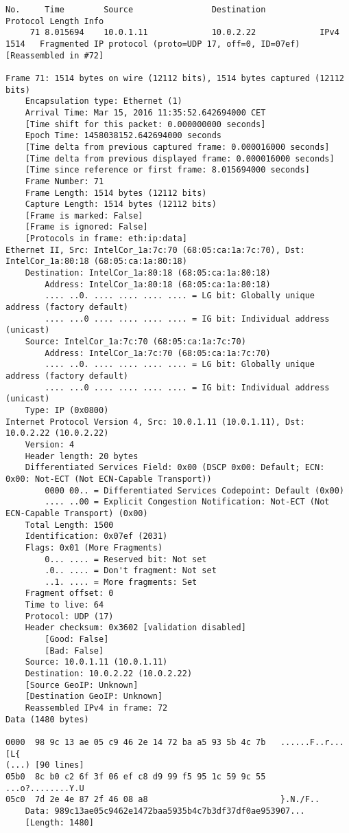 \begin{lstlisting}
No.     Time        Source                Destination           Protocol Length Info
     71 8.015694    10.0.1.11             10.0.2.22             IPv4     1514   Fragmented IP protocol (proto=UDP 17, off=0, ID=07ef) [Reassembled in #72]

Frame 71: 1514 bytes on wire (12112 bits), 1514 bytes captured (12112 bits)
    Encapsulation type: Ethernet (1)
    Arrival Time: Mar 15, 2016 11:35:52.642694000 CET
    [Time shift for this packet: 0.000000000 seconds]
    Epoch Time: 1458038152.642694000 seconds
    [Time delta from previous captured frame: 0.000016000 seconds]
    [Time delta from previous displayed frame: 0.000016000 seconds]
    [Time since reference or first frame: 8.015694000 seconds]
    Frame Number: 71
    Frame Length: 1514 bytes (12112 bits)
    Capture Length: 1514 bytes (12112 bits)
    [Frame is marked: False]
    [Frame is ignored: False]
    [Protocols in frame: eth:ip:data]
Ethernet II, Src: IntelCor_1a:7c:70 (68:05:ca:1a:7c:70), Dst: IntelCor_1a:80:18 (68:05:ca:1a:80:18)
    Destination: IntelCor_1a:80:18 (68:05:ca:1a:80:18)
        Address: IntelCor_1a:80:18 (68:05:ca:1a:80:18)
        .... ..0. .... .... .... .... = LG bit: Globally unique address (factory default)
        .... ...0 .... .... .... .... = IG bit: Individual address (unicast)
    Source: IntelCor_1a:7c:70 (68:05:ca:1a:7c:70)
        Address: IntelCor_1a:7c:70 (68:05:ca:1a:7c:70)
        .... ..0. .... .... .... .... = LG bit: Globally unique address (factory default)
        .... ...0 .... .... .... .... = IG bit: Individual address (unicast)
    Type: IP (0x0800)
Internet Protocol Version 4, Src: 10.0.1.11 (10.0.1.11), Dst: 10.0.2.22 (10.0.2.22)
    Version: 4
    Header length: 20 bytes
    Differentiated Services Field: 0x00 (DSCP 0x00: Default; ECN: 0x00: Not-ECT (Not ECN-Capable Transport))
        0000 00.. = Differentiated Services Codepoint: Default (0x00)
        .... ..00 = Explicit Congestion Notification: Not-ECT (Not ECN-Capable Transport) (0x00)
    Total Length: 1500
    Identification: 0x07ef (2031)
    Flags: 0x01 (More Fragments)
        0... .... = Reserved bit: Not set
        .0.. .... = Don't fragment: Not set
        ..1. .... = More fragments: Set
    Fragment offset: 0
    Time to live: 64
    Protocol: UDP (17)
    Header checksum: 0x3602 [validation disabled]
        [Good: False]
        [Bad: False]
    Source: 10.0.1.11 (10.0.1.11)
    Destination: 10.0.2.22 (10.0.2.22)
    [Source GeoIP: Unknown]
    [Destination GeoIP: Unknown]
    Reassembled IPv4 in frame: 72
Data (1480 bytes)

0000  98 9c 13 ae 05 c9 46 2e 14 72 ba a5 93 5b 4c 7b   ......F..r...[L{
(...) [90 lines]
05b0  8c b0 c2 6f 3f 06 ef c8 d9 99 f5 95 1c 59 9c 55   ...o?........Y.U
05c0  7d 2e 4e 87 2f 46 08 a8                           }.N./F..
    Data: 989c13ae05c9462e1472baa5935b4c7b3df37df0ae953907...
    [Length: 1480]
\end{lstlisting}


